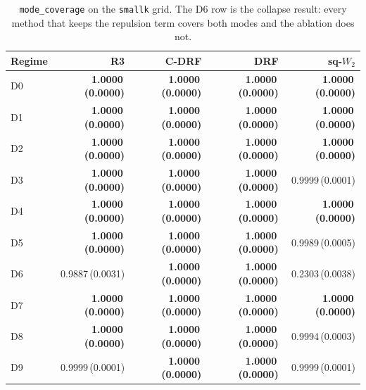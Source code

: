 \begin{table}[htbp]
\centering
\caption{\texttt{mode\_coverage} on the \texttt{smallk} grid. The D6 row is the collapse result: every method that keeps the repulsion term covers both modes and the ablation does not.}
\label{tab:smallk-mode}
\scriptsize
\setlength{\tabcolsep}{3.2pt}
\begin{tabular}{@{}lrrrr@{}}
\toprule
Regime & R3 & C-DRF & DRF & sq-$W_2$ \\
\midrule
D0 & \textbf{1.0000\,(0.0000)} & \textbf{1.0000\,(0.0000)} & \textbf{1.0000\,(0.0000)} & \textbf{1.0000\,(0.0000)} \\
D1 & \textbf{1.0000\,(0.0000)} & \textbf{1.0000\,(0.0000)} & \textbf{1.0000\,(0.0000)} & \textbf{1.0000\,(0.0000)} \\
D2 & \textbf{1.0000\,(0.0000)} & \textbf{1.0000\,(0.0000)} & \textbf{1.0000\,(0.0000)} & \textbf{1.0000\,(0.0000)} \\
D3 & \textbf{1.0000\,(0.0000)} & \textbf{1.0000\,(0.0000)} & \textbf{1.0000\,(0.0000)} & 0.9999\,(0.0001) \\
D4 & \textbf{1.0000\,(0.0000)} & \textbf{1.0000\,(0.0000)} & \textbf{1.0000\,(0.0000)} & \textbf{1.0000\,(0.0000)} \\
D5 & \textbf{1.0000\,(0.0000)} & \textbf{1.0000\,(0.0000)} & \textbf{1.0000\,(0.0000)} & 0.9989\,(0.0005) \\
D6 & 0.9887\,(0.0031) & \textbf{1.0000\,(0.0000)} & \textbf{1.0000\,(0.0000)} & 0.2303\,(0.0038) \\
D7 & \textbf{1.0000\,(0.0000)} & \textbf{1.0000\,(0.0000)} & \textbf{1.0000\,(0.0000)} & \textbf{1.0000\,(0.0000)} \\
D8 & \textbf{1.0000\,(0.0000)} & \textbf{1.0000\,(0.0000)} & \textbf{1.0000\,(0.0000)} & 0.9994\,(0.0003) \\
D9 & 0.9999\,(0.0001) & \textbf{1.0000\,(0.0000)} & \textbf{1.0000\,(0.0000)} & 0.9999\,(0.0001) \\
\bottomrule
\end{tabular}
\end{table}

